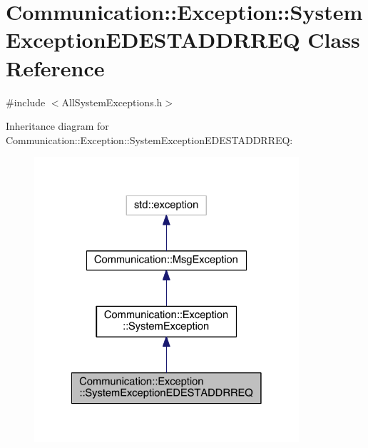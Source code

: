 \hypertarget{class_communication_1_1_exception_1_1_system_exception_e_d_e_s_t_a_d_d_r_r_e_q}{}\section{Communication\+:\+:Exception\+:\+:System\+Exception\+E\+D\+E\+S\+T\+A\+D\+D\+R\+R\+E\+Q Class Reference}
\label{class_communication_1_1_exception_1_1_system_exception_e_d_e_s_t_a_d_d_r_r_e_q}


{\ttfamily \#include $<$All\+System\+Exceptions.\+h$>$}



Inheritance diagram for Communication\+:\+:Exception\+:\+:System\+Exception\+E\+D\+E\+S\+T\+A\+D\+D\+R\+R\+E\+Q\+:\nopagebreak
\begin{figure}[H]
\begin{center}
\leavevmode
\includegraphics[width=278pt]{class_communication_1_1_exception_1_1_system_exception_e_d_e_s_t_a_d_d_r_r_e_q__inherit__graph}
\end{center}
\end{figure}


